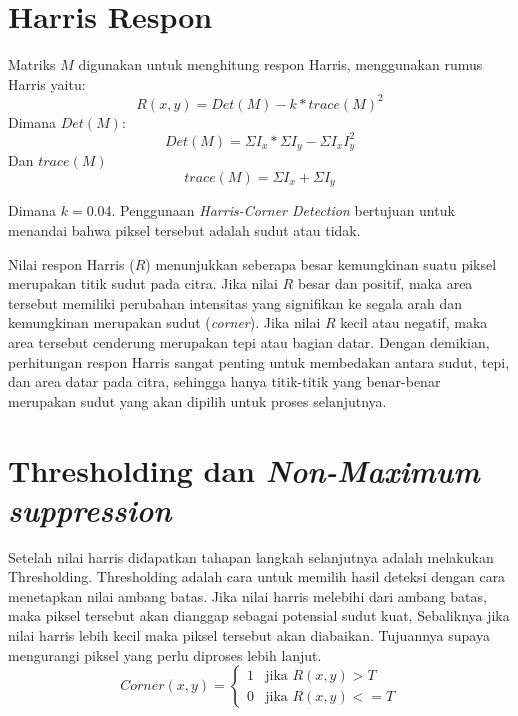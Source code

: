 \section{Harris Respon}
    Matriks \(M\) digunakan untuk menghitung respon Harris, menggunakan rumus Harris yaitu:
\begin{equation}
    R(x,y) = Det(M) - k * {trace(M)}^2
\end{equation}
Dimana \(Det(M)\):
\begin{equation*}
    Det(M) = \Sigma I_{x} * \Sigma I_{y} - \Sigma I_{x}I_{y}^2
\end{equation*}
Dan \(trace(M)\) 
\begin{equation*}
    trace(M) = \Sigma I_{x} + \Sigma I_{y}
\end{equation*}

    Dimana \(k = 0.04\). Penggunaan \emph{Harris-Corner Detection} bertujuan untuk menandai bahwa piksel tersebut adalah sudut atau tidak.

    Nilai respon Harris (\(R\)) menunjukkan seberapa besar kemungkinan suatu piksel merupakan titik sudut pada citra. Jika nilai \(R\) besar dan positif, maka area tersebut memiliki perubahan intensitas yang signifikan ke segala arah dan kemungkinan merupakan sudut (\emph{corner}). Jika nilai \(R\) kecil atau negatif, maka area tersebut cenderung merupakan tepi atau bagian datar. Dengan demikian, perhitungan respon Harris sangat penting untuk membedakan antara sudut, tepi, dan area datar pada citra, sehingga hanya titik-titik yang benar-benar merupakan sudut yang akan dipilih untuk proses selanjutnya.

\section{Thresholding dan \emph{Non-Maximum suppression}}
    Setelah nilai harris didapatkan tahapan langkah selanjutnya adalah melakukan Thresholding.
Thresholding adalah cara untuk memilih hasil deteksi dengan cara menetapkan nilai ambang batas.
Jika nilai harris melebihi dari ambang batas, maka piksel tersebut akan dianggap sebagai potensial sudut kuat, Sebaliknya jika nilai harris lebih kecil maka piksel tersebut akan diabaikan.
Tujuannya supaya mengurangi piksel yang perlu diproses lebih lanjut.
\begin{equation}
    Corner(x,y) = 
    \begin{cases}  
        1 & \text{jika } R(x,y) > T \\ 
        0 & \text{jika } R(x,y) <= T
    \end{cases}
\end{equation}

